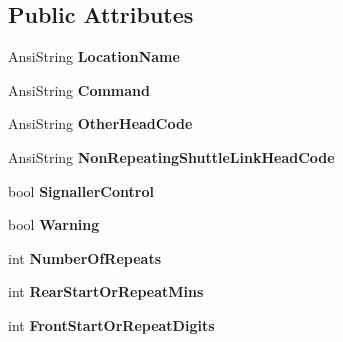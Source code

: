 \subsection*{Public Attributes}
\begin{DoxyCompactItemize}
\item 
\mbox{\label{class_t_action_vector_entry_afdc4364c8698998b3689039a32b8c148}} 
Ansi\+String {\bfseries Location\+Name}
\item 
\mbox{\label{class_t_action_vector_entry_a570ca952f6414e838be644082f02eed1}} 
Ansi\+String {\bfseries Command}
\item 
\mbox{\label{class_t_action_vector_entry_a0cce6ed92eea821583a661966baae024}} 
Ansi\+String {\bfseries Other\+Head\+Code}
\item 
\mbox{\label{class_t_action_vector_entry_ae142e8e9d3a842c9b1d81bcd4e93e291}} 
Ansi\+String {\bfseries Non\+Repeating\+Shuttle\+Link\+Head\+Code}
\item 
\mbox{\label{class_t_action_vector_entry_a858aae4488b108f2e2771b1ef0e2905e}} 
bool {\bfseries Signaller\+Control}
\item 
\mbox{\label{class_t_action_vector_entry_a43fd46452123d72efc2bd9d10008b6f1}} 
bool {\bfseries Warning}
\item 
\mbox{\label{class_t_action_vector_entry_a5f4a663fd91b104c7f93990d79c16d1d}} 
int {\bfseries Number\+Of\+Repeats}
\item 
\mbox{\label{class_t_action_vector_entry_a18171f01d5e5e01242c3c672045efb28}} 
int {\bfseries Rear\+Start\+Or\+Repeat\+Mins}
\item 
\mbox{\label{class_t_action_vector_entry_a8b84cb2a020cfb2f81a091f3bdc59ec4}} 
int {\bfseries Front\+Start\+Or\+Repeat\+Digits}
\item 
\mbox{\label{class_t_action_vector_entry_a07850a494d4c0c71e9579c21c1910b76}} 

\end{DoxyCompactItemize}
